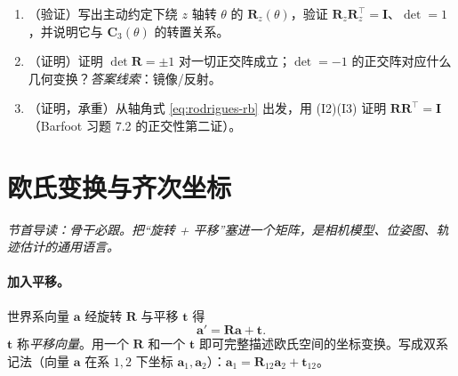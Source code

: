 \begin{practice}
\begin{enumerate}
  \item （验证）写出主动约定下绕 $z$ 轴转 $\theta$ 的 $\mathbf{R}_z(\theta)$，验证 $\mathbf{R}_z\mathbf{R}_z^\top=\mathbf{I}$、$\det=1$，并说明它与 $\mathbf{C}_3(\theta)$ 的转置关系。
  \item （证明）证明 $\det\mathbf{R}=\pm1$ 对一切正交阵成立；$\det=-1$ 的正交阵对应什么几何变换？\emph{答案线索}：镜像/反射。
  \item （证明，承重）从轴角式 \cref{eq:rodrigues-rb} 出发，用 (I2)(I3) 证明 $\mathbf{R}\mathbf{R}^\top=\mathbf{I}$（Barfoot 习题 7.2 的正交性第二证）。
\end{enumerate}
\end{practice}

\section{欧氏变换与齐次坐标}
\label{sec:rb-se3}
\noindent\emph{节首导读：骨干必跟。把“旋转 + 平移”塞进一个矩阵，是相机模型、位姿图、轨迹估计的通用语言。}

\paragraph{加入平移。}世界系向量 $\mathbf{a}$ 经旋转 $\mathbf{R}$ 与平移 $\mathbf{t}$ 得
\begin{equation}
  \mathbf{a}'=\mathbf{R}\mathbf{a}+\mathbf{t}.
  \label{eq:euclid}
\end{equation}
$\mathbf{t}$ 称\emph{平移向量}。用一个 $\mathbf{R}$ 和一个 $\mathbf{t}$ 即可完整描述欧氏空间的坐标变换。写成双系记法（向量 $\mathbf{a}$ 在系 $1,2$ 下坐标 $\mathbf{a}_1,\mathbf{a}_2$）：$\mathbf{a}_1=\mathbf{R}_{12}\mathbf{a}_2+\mathbf{t}_{12}$\cite{gaoxiang2019slam14}。

